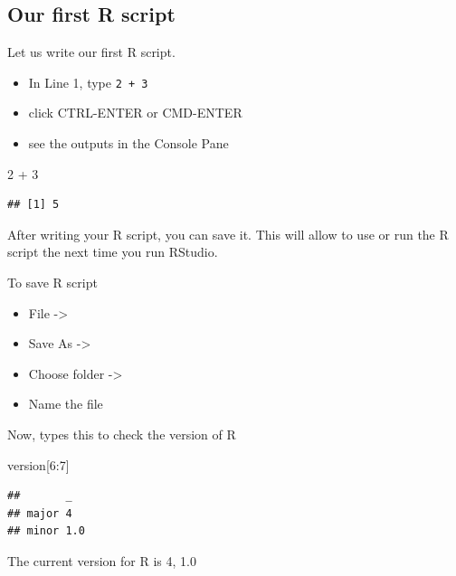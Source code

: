 \documentclass[
]{book}
\makeatletter
\newenvironment{Shaded}{\begin{snugshade}}{\end{snugshade}}
\newcommand{\DecValTok}[1]{\textcolor[rgb]{0.06,0.06,0.06}{#1}}
\newcommand{\NormalTok}[1]{#1}
\newcommand{\SpecialCharTok}[1]{\textcolor[rgb]{0,0,0}{#1}}
\providecommand{\tightlist}{%
  \setlength{\itemsep}{0pt}\setlength{\parskip}{0pt}}
\newenvironment{kframe}{%
\medskip{}
\setlength{\fboxsep}{.8em}
 \def\at@end@of@kframe{}%
 \ifinner\ifhmode%
  \def\at@end@of@kframe{\end{minipage}}%
  \begin{minipage}{\columnwidth}%
 \fi\fi%
 \def\FrameCommand##1{\hskip\@totalleftmargin \hskip-\fboxsep
 \colorbox{shadecolor}{##1}\hskip-\fboxsep
     \hskip-\linewidth \hskip-\@totalleftmargin \hskip\columnwidth}%
 \MakeFramed {\advance\hsize-\width
   \@totalleftmargin\z@ \linewidth\hsize
   \@setminipage}}%
 {\par\unskip\endMakeFramed%
 \at@end@of@kframe}
\renewenvironment{Shaded}{\begin{kframe}}{\end{kframe}}
\makeatother
\begin{document}
\hypertarget{our-first-r-script}{%
\subsection{Our first R script}\label{our-first-r-script}}

Let us write our first R script.

\begin{itemize}
\tightlist
\item
  In Line 1, type \texttt{2\ +\ 3}
\item
  click CTRL-ENTER or CMD-ENTER
\item
  see the outputs in the Console Pane
\end{itemize}

\begin{Shaded}
\begin{Highlighting}[]
\DecValTok{2} \SpecialCharTok{+} \DecValTok{3}
\end{Highlighting}
\end{Shaded}

\begin{verbatim}
## [1] 5
\end{verbatim}

After writing your R script, you can save it. This will allow to use or run the R script the next time you run RStudio.

To save R script

\begin{itemize}
\tightlist
\item
  File -\textgreater{}
\item
  Save As -\textgreater{}
\item
  Choose folder -\textgreater{}\\
\item
  Name the file
\end{itemize}

Now, types this to check the version of R

\begin{Shaded}
\begin{Highlighting}[]
\NormalTok{version[}\DecValTok{6}\SpecialCharTok{:}\DecValTok{7}\NormalTok{]}
\end{Highlighting}
\end{Shaded}

\begin{verbatim}
##       _  
## major 4  
## minor 1.0
\end{verbatim}

The current version for R is 4, 1.0
\end{document}
